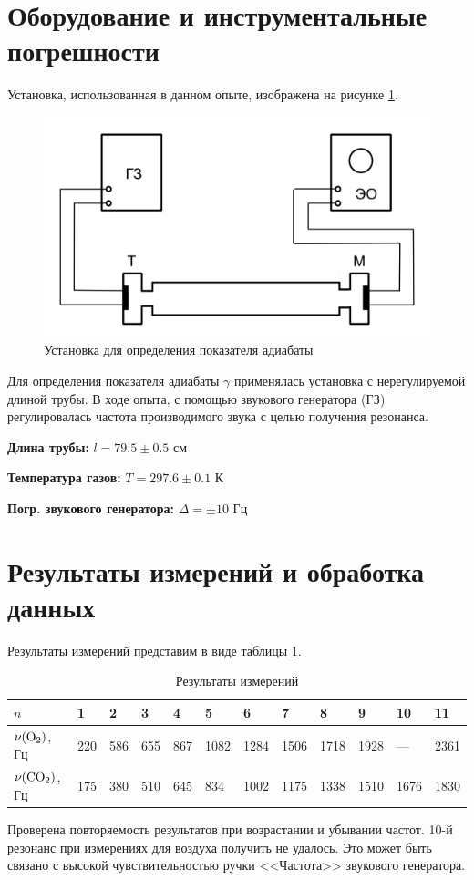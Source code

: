 \documentclass[a4paper]{article}
\begin{document}
\section{Оборудование и инструментальные погрешности}
Установка, использованная в данном опыте, изображена на рисунке \ref{fig:Установка}.
\begin{figure}[p]
	\centering
		\includegraphics[width=1.00\textwidth]{1.jpg}
	\caption{Установка для определения показателя адиабаты}
	\label{fig:Установка}
\end{figure}
Для определения показателя адиабаты $\gamma$ применялась установка с нерегулируемой длиной трубы. В ходе опыта, с помощью звукового генератора (ГЗ) регулировалась частота производимого звука с целью получения резонанса.

{\bf Длина трубы: } $l = 79.5 \pm 0.5 $ см

{\bf Температура газов: } $T = 297.6 \pm 0.1 $ К

{\bf Погр. звукового генератора: } $\Delta = \pm 10 $ Гц

\section{Результаты измерений и обработка данных}
Результаты измерений представим в виде таблицы \ref{tab:РезультатыИзмерений}. 
\begin{table}[h]
	\centering
		\begin{tabular}{|l|l|l|l|l|l|l|l|l|l|l|l|}
\hline
$n$                    & \textbf{1} & \textbf{2} & \textbf{3} & \textbf{4} & \textbf{5} & \textbf{6} & \textbf{7} & \textbf{8} & \textbf{9} & \textbf{10} & \textbf{11} \\ \hline
$\nu({\rm O_2})$, Гц   & 220        & 586        & 655        & 867        & 1082       & 1284       & 1506       & 1718       & 1928       & ---         & 2361        \\ \hline
$\nu({\rm C O_2})$, Гц & 175        & 380        & 510        & 645        & 834        & 1002       & 1175       & 1338       & 1510       & 1676        & 1830        \\ \hline
\end{tabular}
	\caption{Результаты измерений}
	\label{tab:РезультатыИзмерений}
\end{table}
Проверена повторяемость результатов при возрастании и убывании частот. 10-й резонанс при измерениях для воздуха получить не удалось. Это может быть связано с высокой чувствительностью ручки <<Частота>> звукового генератора.
\end{document}
